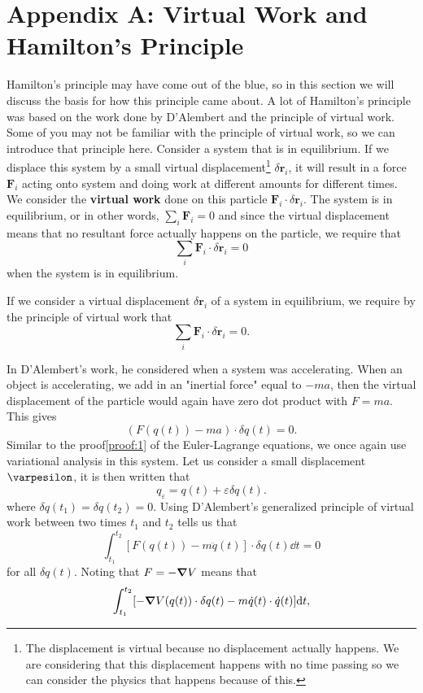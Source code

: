 \documentclass[11pt]{scrartcl}
\renewcommand\vec{\mathbf}
\begin{document}
\section{Appendix A: Virtual Work and Hamilton's Principle}
\label{appendix:a}
Hamilton's principle may have come out of the blue, so in this section we will discuss the basis for how this principle came about. A lot of Hamilton's principle was based on the work done by D'Alembert and the principle of virtual work. Some of you may not be familiar with the principle of virtual work, so we can introduce that principle here. Consider a system that is in equilibrium. If we displace this system by a small virtual displacement\footnote{The displacement is virtual because no displacement actually happens. We are considering that this displacement happens with no time passing so we can consider the physics that happens because of this.} $\delta \vec{r}_i$, it will result in a force $\vec{F}_i$ acting onto system and doing work at different amounts for different times. We consider the \textbf{virtual work} done on this particle $\vec{F}_i \cdot \delta \vec{r}_i$. The system is in equilibrium, or in other words, $\sum_{i}\vec{F}_i = 0$ and since the virtual displacement means that no resultant force actually happens on the particle, we require that 
\[\sum_{i} \vec{F}_i \cdot \delta \vec{r}_i = 0\]
when the system is in equilibrium. 
\begin{theorem}
If we consider a virtual displacement $\delta \vec{r}_i$ of a system in equilibrium, we require by the principle of virtual work that 
\[\sum_{i} \vec{F}_i \cdot \delta \vec{r}_i = 0.\]
\end{theorem}
In D'Alembert's work, he considered when a system was accelerating. When an object is accelerating, we add in an "inertial force" equal to $-ma$, then the virtual displacement of the particle would again have zero dot product with $F=ma$. This gives
\[(F(q(t)) - ma) \cdot \delta q(t) = 0.\]
Similar to the proof\ref{proof:1} of the Euler-Lagrange equations, we once again use variational analysis in this system. Let us consider a small displacement $\varpesilon$, it is then written that 
\[q_{\varepsilon} = q(t) + \varepsilon \delta q (t).\]
where $\delta q(t_1) = \delta q(t_2) = 0$. Using D'Alembert's generalized principle of virtual work between two times $t_1$ and $t_2$ tells us that 
\[\int_{t_1}^{t_2} [F(q(t)) - m\ddot{q} (t) ]\cdot \delta q(t) \dd t = 0\]
for all $\delta q (t)$. Noting that $F = -\grad V$ means that 
\[ \int_{t_1}^{t_2} [-\grad V(q(t)) \cdot \delta q(t) - m\dot{q} (t) \cdot \dot{q}(t)]\dd t,\]
\end{document}
